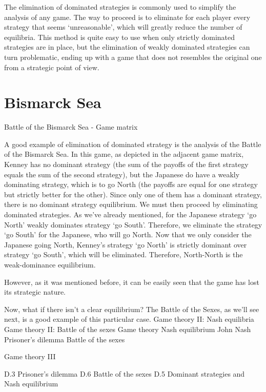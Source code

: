  

The elimination of dominated strategies is commonly used to simplify the analysis of any game. The way to proceed is to eliminate for each player every strategy that seems ‘unreasonable’, which will greatly reduce the number of equilibria. This method is quite easy to use when only strictly dominated strategies are in place, but the elimination of weakly dominated strategies can turn problematic, ending up with a game that does not resembles the original one from a strategic point of view.

\section{Bismarck Sea}
Battle of the Bismarck Sea - Game matrix

A good example of elimination of dominated strategy is the analysis of the Battle of the Bismarck Sea. In this game, as depicted in the adjacent game matrix, Kenney has no dominant strategy (the sum of the payoffs of the first strategy equals the sum of the second strategy), but the Japanese do have a weakly dominating strategy, which is to go North (the payoffs are equal for one strategy but strictly better for the other). Since only one of them has a dominant strategy, there is no dominant strategy equilibrium. We must then proceed by eliminating dominated strategies. As we’ve already mentioned, for the Japanese strategy ‘go North’ weakly dominates strategy ‘go South’. Therefore, we eliminate the strategy ‘go South’ for the Japanese, who will go North. Now that we only consider the Japanese going North, Kenney’s strategy ‘go North’ is strictly dominant over strategy ‘go South’, which will be eliminated. Therefore, North-North is the weak-dominance equilibrium.

However, as it was mentioned before, it can be easily seen that the game has lost its strategic nature.

Now, what if there isn’t a clear equilibrium? The Battle of the Sexes, as we’ll see next, is a good example of this particular case.
	Game theory II: Nash equilibria Game theory II: Battle of the sexes 
Game theory
Nash equilibrium
John Nash
Prisoner’s dilemma
Battle of the sexes
 
Game theory III
 
D.3 Prisoner’s dilemma
D.6 Battle of the sexes
D.5 Dominant strategies and Nash equilibrium



